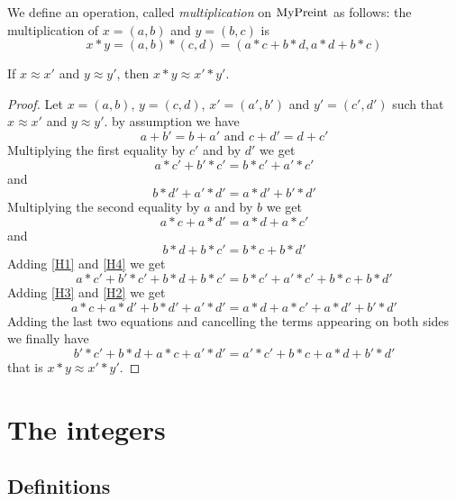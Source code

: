 \begin{definition}
    \label{MyPreint.mul}
    \leanok
We define an operation, called \emph{multiplication} on $\mathrm{MyPreint}$ as follows: the multiplication of $x = (a,b)$ and $y = (b, c)$ is
\[
x * y = (a,b) * (c,d) = (a*c+b*d, a*d+b*c)
\]
\end{definition}

\begin{lemma}
    \label{MyPreint.mul_quotient}
    \leanok
If $x \approx x'$ and $y \approx y'$, then $x * y \approx x' * y'$.
\end{lemma}
\begin{proof}
\leanok
Let $x = (a,b)$, $y = (c,d)$, $x' = (a',b')$ and $y' = (c',d')$ such that $x \approx x'$ and $y \approx y'$. by assumption we have
\[
a + b' = b + a' \mbox{ and } c + d' = d + c'
\]
Multiplying the first equality by $c'$ and by $d'$ we get
\begin{equation} \label{H1}
a * c' + b' * c' = b * c' + a' * c'
\end{equation}
and
\begin{equation} \label{H2}
b * d' + a' * d' = a * d' + b' * d'
\end{equation}
Multiplying the second equality by $a$ and by $b$ we get
\begin{equation} \label{H3}
a * c + a * d' = a * d + a * c'
\end{equation}
and
\begin{equation} \label{H4}
b * d + b * c' = b * c + b * d'
\end{equation}
Adding \eqref{H1} and \eqref{H4} we get
\[
a * c' + b' * c' + b * d + b * c' = b * c' + a' * c' + b * c + b * d'
\]
Adding \eqref{H3} and \eqref{H2} we get
\[
 a * c + a * d' + b * d' + a' * d' = a * d + a * c' + a * d' + b' * d'
\]
Adding the last two equations and cancelling the terms appearing on both sides we finally have
\[
b' * c' + b * d + a * c + a' * d' =  a' * c' + b * c + a * d + b' * d'
\]
that is $x * y \approx  x'*y'$.
\end{proof}

\section{The integers}

\subsection{Definitions}

